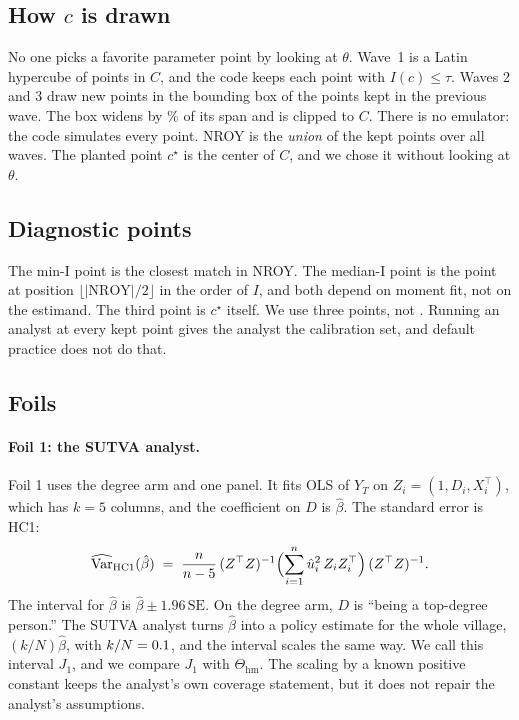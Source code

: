 \documentclass[11pt]{article}
\newcommand{\NROY}{\mathrm{NROY}}
\newcommand{\hm}{\mathrm{hm}}
\newcommand{\Jone}{J_1}
\begin{document}
\subsection{How \texorpdfstring{$c$}{c} is drawn}
No one picks a favorite parameter point by looking at $\theta$. Wave~1 is a
Latin hypercube of \WavePoints{} points in $C$, and the code keeps each
point with $I(c)\le\tau$. Waves 2 and 3 draw \WavePoints{} new points in the
bounding box of the points kept in the previous wave. The box widens by
\BoxInflationPct\% of its span and is clipped to $C$. There is no
emulator: the code simulates every point. NROY is the \emph{union} of
the kept points over all waves. The planted point $c^\star$ is the center of
$C$, and we chose it without looking at $\theta$.

\subsection{Diagnostic points}
The min-I point is the closest match in NROY. The median-I point is the
point at position $\lfloor |\NROY|/2\rfloor$ in the order of $I$, and both depend on moment
fit, not on the estimand. The third point is $c^\star$ itself. We use three points, not \ThetaSample. Running
an analyst at every kept point gives the analyst the calibration set,
and default practice does not do that.

\subsection{Foils}
\label{sec:design}
\paragraph{Foil 1: the SUTVA analyst.}
Foil 1 uses the degree arm and one panel. It fits OLS of $Y_T$ on $Z_i=(1,D_i,X_i^\top)$,
which has $k=5$ columns, and the coefficient on $D$ is $\hat\beta$. The standard
error is HC1:
\begin{equation}
  \widehat{\mathrm{Var}}_{\mathrm{HC1}}(\hat\beta)
  \;=\;
  \frac{n}{n-5}
  \,(Z^\top Z)^{-1}
  \Bigl(\sum_{i=1}^{n}\hat u_i^2\,Z_i Z_i^\top\Bigr)
  \,(Z^\top Z)^{-1}.
\end{equation}
The interval for $\hat\beta$ is $\hat\beta\pm1.96\,\mathrm{SE}$. On the degree arm, $D$ is ``being a
top-degree person.'' The SUTVA analyst turns $\hat\beta$ into a policy estimate
for the whole village, $(k/N)\hat\beta$, with $k/N=0.1$, and the interval scales the same
way. We call this interval $\Jone$, and we compare $\Jone$ with $\Theta_{\hm}$. The scaling by a
known positive constant keeps the analyst's own coverage statement, but
it does not repair the analyst's assumptions.
\end{document}
